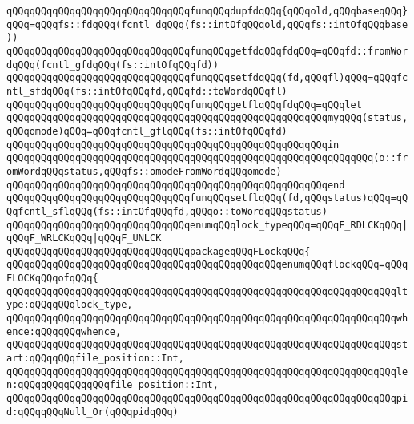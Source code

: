 \verb|qQQqqQQqqQQqqQQqqQQqqQQqqQQqqQQqfunqQQqdupfdqQQq{qQQqold,qQQqbaseqQQq}qQQq=qQQqfs::fdqQQq(fcntl_dqQQq(fs::intOfqQQqold,qQQqfs::intOfqQQqbase))|\newline
\verb|qQQqqQQqqQQqqQQqqQQqqQQqqQQqqQQqfunqQQqgetfdqQQqfdqQQq=qQQqfd::fromWordqQQq(fcntl_gfdqQQq(fs::intOfqQQqfd))|\newline
\verb|qQQqqQQqqQQqqQQqqQQqqQQqqQQqqQQqfunqQQqsetfdqQQq(fd,qQQqfl)qQQq=qQQqfcntl_sfdqQQq(fs::intOfqQQqfd,qQQqfd::toWordqQQqfl)|\newline
\verb|qQQqqQQqqQQqqQQqqQQqqQQqqQQqqQQqfunqQQqgetflqQQqfdqQQq=qQQqlet|\newline
\verb|qQQqqQQqqQQqqQQqqQQqqQQqqQQqqQQqqQQqqQQqqQQqqQQqqQQqqQQqmyqQQq(status,qQQqomode)qQQq=qQQqfcntl_gflqQQq(fs::intOfqQQqfd)|\newline
\verb|qQQqqQQqqQQqqQQqqQQqqQQqqQQqqQQqqQQqqQQqqQQqqQQqqQQqqQQqin|\newline
\verb|qQQqqQQqqQQqqQQqqQQqqQQqqQQqqQQqqQQqqQQqqQQqqQQqqQQqqQQqqQQqqQQq(o::fromWordqQQqstatus,qQQqfs::omodeFromWordqQQqomode)|\newline
\verb|qQQqqQQqqQQqqQQqqQQqqQQqqQQqqQQqqQQqqQQqqQQqqQQqqQQqqQQqend|\newline
\verb|qQQqqQQqqQQqqQQqqQQqqQQqqQQqqQQqfunqQQqsetflqQQq(fd,qQQqstatus)qQQq=qQQqfcntl_sflqQQq(fs::intOfqQQqfd,qQQqo::toWordqQQqstatus)|\newline
\newline
\verb|qQQqqQQqqQQqqQQqqQQqqQQqqQQqqQQqenumqQQqlock_typeqQQq=qQQqF_RDLCKqQQq|\verb#|qQQqF_WRLCKqQQq|qQQqF_UNLCK#\newline
\newline
\verb|qQQqqQQqqQQqqQQqqQQqqQQqqQQqqQQqpackageqQQqFLockqQQq{|\newline
\newline
\verb|qQQqqQQqqQQqqQQqqQQqqQQqqQQqqQQqqQQqqQQqqQQqqQQqenumqQQqflockqQQq=qQQqFLOCKqQQqofqQQq{|\newline
\verb|qQQqqQQqqQQqqQQqqQQqqQQqqQQqqQQqqQQqqQQqqQQqqQQqqQQqqQQqqQQqqQQqqQQqltype:qQQqqQQqlock_type,|\newline
\verb|qQQqqQQqqQQqqQQqqQQqqQQqqQQqqQQqqQQqqQQqqQQqqQQqqQQqqQQqqQQqqQQqqQQqwhence:qQQqqQQqwhence,|\newline
\verb|qQQqqQQqqQQqqQQqqQQqqQQqqQQqqQQqqQQqqQQqqQQqqQQqqQQqqQQqqQQqqQQqqQQqstart:qQQqqQQqfile_position::Int,|\newline
\verb|qQQqqQQqqQQqqQQqqQQqqQQqqQQqqQQqqQQqqQQqqQQqqQQqqQQqqQQqqQQqqQQqqQQqlen:qQQqqQQqqQQqqQQqfile_position::Int,|\newline
\verb|qQQqqQQqqQQqqQQqqQQqqQQqqQQqqQQqqQQqqQQqqQQqqQQqqQQqqQQqqQQqqQQqqQQqpid:qQQqqQQqNull_Or(qQQqpidqQQq)|\newline
